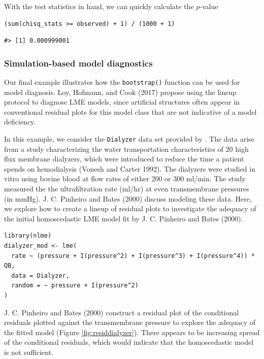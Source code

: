 With the test statistics in hand, we can quickly calculate the \(p\)-value

\begin{verbatim}
(sum(chisq_stats >= observed) + 1) / (1000 + 1)
\end{verbatim}

\begin{verbatim}
#> [1] 0.000999001
\end{verbatim}

\hypertarget{simulation-based-model-diagnostics}{%
\subsubsection{Simulation-based model diagnostics}\label{simulation-based-model-diagnostics}}

Our final example illustrates how the \texttt{bootstrap()} function can be used for model diagnosis. Loy, Hofmann, and Cook (2017) propose using the lineup protocol to diagnose LME models, since artificial structures often appear in conventional residual plots for this model class that are not indicative of a model deficiency.

In this example, we consider the \texttt{Dialyzer} data set provided by . The data arise from a study characterizing the water transportation characteristics of 20 high flux membrane dialyzers, which were introduced to reduce the time a patient spends on hemodialysis (Vonesh and Carter 1992). The dialyzers were studied in vitro using bovine blood at flow rates of either 200 or 300 ml/min. The study measured the the ultrafiltration rate (ml/hr) at even transmembrane pressures (in mmHg). J. C. Pinheiro and Bates (2000) discuss modeling these data. Here, we explore how to create a lineup of residual plots to investigate the adequacy of the initial homoscedastic LME model fit by J. C. Pinheiro and Bates (2000).

\begin{verbatim}
library(nlme)
dialyzer_mod <- lme(
  rate ~ (pressure + I(pressure^2) + I(pressure^3) + I(pressure^4)) * QB, 
  data = Dialyzer, 
  random = ~ pressure + I(pressure^2)
)
\end{verbatim}

J. C. Pinheiro and Bates (2000) construct a residual plot of the conditional residuals plotted against the transmembrane pressure to explore the adequacy of the fitted model (Figure \ref{fig:residdialyzer}). There appears to be increasing spread of the conditional residuals, which would indicate that the homoscedastic model is not sufficient.

